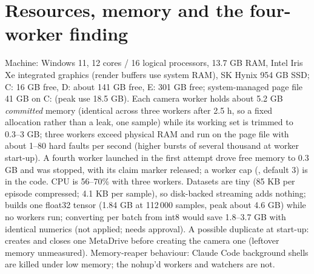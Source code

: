 \documentclass[10.5pt,a4paper]{article}
\newcommand{\code}[1]{\texttt{\detokenize{#1}}}
\begin{document}
\section{Resources, memory and the four-worker finding}\label{sec:memory}
Machine: Windows 11, 12 cores / 16 logical processors, 13.7 GB RAM, Intel Iris Xe integrated graphics (render buffers use system RAM), SK Hynix 954 GB SSD; C: 16 GB free, D: about 141 GB free, E: 301 GB free; system-managed page file 41 GB on C: (peak use 18.5 GB). Each camera worker holds about 5.2 GB \emph{committed} memory (identical across three workers after 2.5 h, so a fixed allocation rather than a leak, one sample) while its working set is trimmed to 0.3--3 GB; three workers exceed physical RAM and run on the page file with about 1--80 hard faults per second (higher bursts of several thousand at worker start-up). A fourth worker launched in the first attempt drove free memory to 0.3 GB and was stopped, with its claim marker released; a worker cap (\code{CAM_MAX_WORKERS}, default 3) is in the code. CPU is 56--70\% with three workers. Datasets are tiny (85 KB per episode compressed; 4.1 KB per sample), so disk-backed streaming adds nothing; \code{train()} builds one float32 tensor (1.84 GB at 112\,000 samples, peak about 4.6 GB) while no workers run; converting per batch from int8 would save 1.8--3.7 GB with identical numerics (not applied; needs approval). A possible duplicate at start-up: \code{E2EEnv} creates and closes one MetaDrive before creating the camera one (leftover memory unmeasured). Memory-reaper behaviour: Claude Code background shells are killed under low memory; the nohup'd workers and watchers are not.
\end{document}
